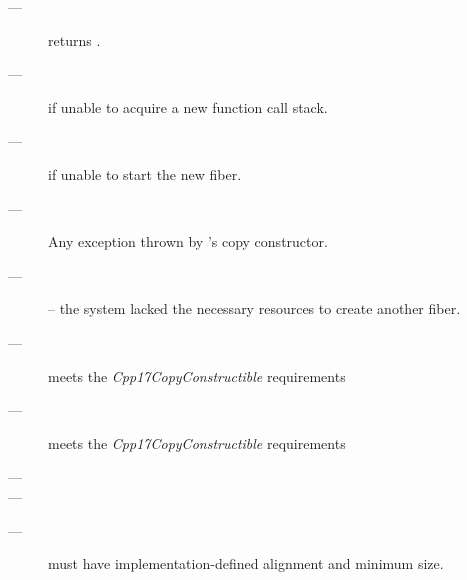 \postcond
\begin{description}
    \item[---] \emptyfn returns \false.
\end{description}

\except
\begin{description}
    \item[---]  if unable to acquire a new function call stack.
    \item[---]  if unable to start the new fiber.
    \item[---] Any exception thrown by 's copy constructor.
\end{description}

\errors
\begin{description}
    \item[---]  -- the system lacked the necessary resources to create another fiber.
\end{description}


\mandates
\begin{description}
    \item[---]  meets the \emph{Cpp17CopyConstructible} requirements
    \item[---]  meets the \emph{Cpp17CopyConstructible} requirements
    \item[---] 
    \item[---] 
\end{description}

\precond
\begin{description}
    \item[---]  must have implementation-defined alignment and minimum size.
\end{description}


